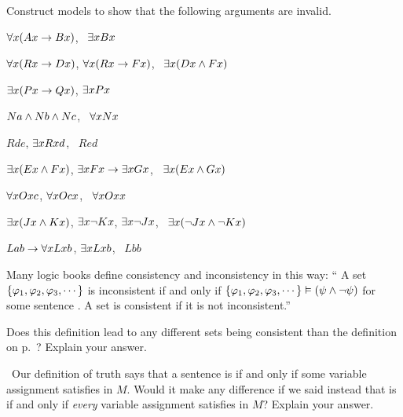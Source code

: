 \problempart
Construct models to show that the following arguments are invalid.
\begin{earg}
\item $\forall x(Ax \rightarrow Bx)$, \therefore\ $\exists x Bx$
\item $\forall x(Rx \rightarrow Dx)$, $\forall x(Rx \rightarrow Fx)$, \therefore\ $\exists x(Dx \wedge Fx)$
\item $\exists x(Px\rightarrow Qx)$, \therefore $\exists x Px$
\item $Na \wedge Nb \wedge Nc$, \therefore\ $\forall x Nx$
\item $Rde$, $\exists x Rxd$, \therefore\ $Red$
\item $\exists x(Ex \wedge Fx)$, $\exists x Fx \rightarrow \exists x Gx$, \therefore\ $\exists x(Ex \wedge Gx)$
\item $\forall x Oxc$, $\forall x Ocx$, \therefore\ $\forall x Oxx$
\item $\exists x(Jx \wedge Kx)$, $\exists x \neg Kx$, $\exists x \neg Jx$, \therefore\ $\exists x(\neg Jx \wedge \neg Kx)$
\item $Lab \rightarrow \forall x Lxb$, $\exists x Lxb$, \therefore\ $Lbb$
\end{earg}





\problempart
\label{pr.SemanticsEssay}
\begin{earg}
\item Many logic books define consistency and inconsistency in this way:
`` A set $\{\varphi{}_1,\varphi{}_2,\varphi{}_3,\cdots\}$ is inconsistent if and only if $\{\varphi{}_1,\varphi{}_2,\varphi{}_3,\cdots\}\vDash(\psi{}\wedge\neg\psi{})$ for some sentence \metaB{}. A set is consistent if it is not inconsistent.''

Does this definition lead to any different sets being consistent than the definition on  p.~\pageref{def.consistencySL}? Explain your answer.

\item\leftsolutions\ Our definition of truth says that a sentence \metaA{} is   if and only if some variable assignment satisfies \metaA{} in $M$. Would it make any difference if we said instead that \metaA{} is   if and only if \emph{every} variable assignment satisfies \metaA{} in $M$? Explain your answer.
\end{earg}

\fi
